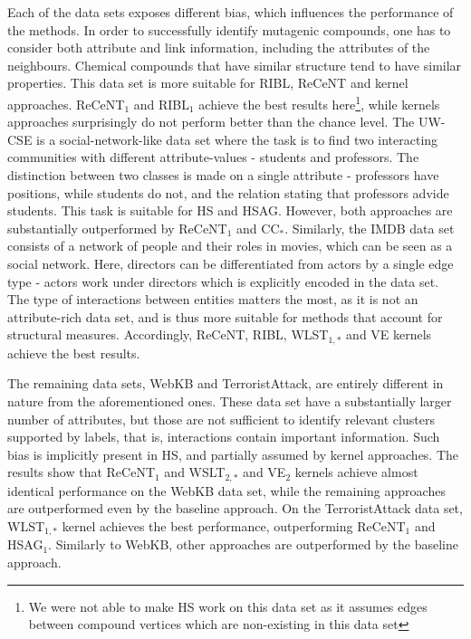 Each of the data sets exposes different bias, which influences the performance of the methods.
In order to successfully identify mutagenic compounds, one has to consider both attribute and link information, including the attributes of the neighbours.
Chemical compounds that have similar structure tend to have similar properties.
This data set is more suitable for RIBL, ReCeNT and kernel approaches.
ReCeNT$_1$ and RIBL$_1$ achieve the best results here\footnote{We were not able to make HS work on this data set as it assumes edges between compound vertices which are non-existing in this data set}, while kernels approaches surprisingly do not perform better than the chance level.
The UW-CSE is a social-network-like data set where the task is to find two interacting  communities with different attribute-values - students and professors.
The distinction between two classes is made on a single attribute - professors have positions, while students do not, and the relation stating that professors advide students.
This task is suitable for HS and HSAG.
However, both approaches are substantially outperformed by ReCeNT$_1$ and CC$_*$.
Similarly, the IMDB data set consists of a network of people and their roles in movies, which can be seen as a social network.
Here, directors can be differentiated from actors by a single edge type - actors work under directors which is explicitly encoded in the data set.
The type of interactions between entities matters the most, as it is not an attribute-rich data set, and is thus more suitable for methods that account for structural measures.
Accordingly, ReCeNT, RIBL, WLST$_{1,*}$ and VE  kernels achieve the best results.





The remaining data sets, WebKB and TerroristAttack, are entirely different in nature from the aforementioned ones.
These data set have a substantially larger number of attributes, but those are not sufficient to identify relevant clusters supported by labels, that is,  interactions contain important information.
Such bias is implicitly present in HS, and partially assumed by kernel approaches.
The results show that ReCeNT$_1$ and WSLT$_{2,*}$ and VE$_2$ kernels achieve almost identical performance on the WebKB data set, while the remaining approaches are outperformed even by the baseline approach.
On the TerroristAttack data set, WLST$_{1,*}$ kernel achieves the best performance, outperforming ReCeNT$_1$ and HSAG$_1$.
Similarly to WebKB, other approaches are outperformed by the baseline approach.






